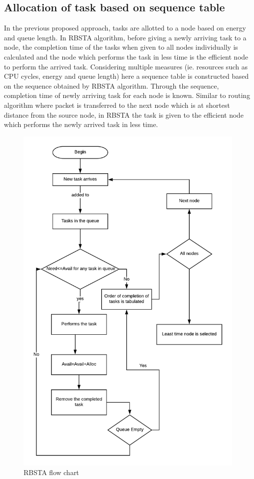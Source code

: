 \documentclass[conference]{IEEEtran}
\begin{document}
\subsection{Allocation of task based on sequence table}
In the previous proposed approach, tasks are allotted to a node based on energy and queue length. In RBSTA algorithm, before giving a newly arriving task to a node, the completion time of the tasks when given to all nodes individually is calculated and the node which performs the task in less time is the efficient node to perform the arrived task. Considering multiple measures (ie. resources such as CPU cycles, energy and queue length) here a sequence table is constructed based on the sequence obtained by RBSTA algorithm. Through the sequence, completion time of newly arriving task for each node is known. Similar to routing algorithm where packet is transferred to the next node which is at shortest distance from the source node, in RBSTA the task is given to the efficient node which performs the newly arrived task in less time.

\begin{figure}[H]
\includegraphics[width=\linewidth]{RBSTA.png}
  \caption{RBSTA flow chart}
  \label{fig:1}
\end{figure}
\end{document}
